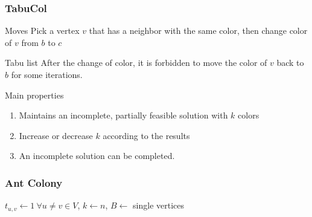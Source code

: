 \begin{frame}[fragile]
\frametitle{TabuCol}
\begin{block}{Moves}
Pick a vertex \(v\) that has a neighbor with the same color, then change color
of \(v\) from \(b\) to \(c\)
\end{block}

\begin{block}{Tabu list}
After the change of color, it is \alert{forbidden} to move the color of \(v\)
back to \(b\) for some iterations.
\end{block}

\begin{block}{Main properties}
\begin{enumerate}
\item
      Maintains an incomplete, partially feasible solution with \(k\) colors
\item
      Increase or decrease \(k\) according to the results
\item
      An incomplete solution can be completed.
\end{enumerate}
\end{block}
\end{frame}

\begin{frame}[fragile]
\frametitle{Ant Colony}
\begin{algorithm}[H]
\(t_{u,v}\gets 1 \ \forall u\neq v\in V\), \(k\gets n\), \(B\gets\) single vertices
\end{algorithm}
\end{frame}




